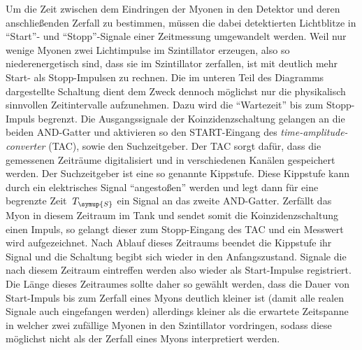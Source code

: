 Um die Zeit zwischen dem Eindringen der Myonen in den Detektor und deren
anschließenden Zerfall zu bestimmen, müssen die dabei detektierten Lichtblitze
in \enquote{Start}- und \enquote{Stopp}-Signale einer Zeitmessung umgewandelt
werden. Weil nur wenige Myonen zwei Lichtimpulse im Szintillator erzeugen, also
so niederenergetisch sind, dass sie im Szintillator zerfallen, ist mit deutlich
mehr Start- als Stopp-Impulsen zu rechnen. Die im unteren Teil des Diagramms
dargestellte Schaltung dient dem Zweck dennoch möglichst nur die physikalisch
sinnvollen Zeitintervalle aufzunehmen. Dazu wird die \enquote{Wartezeit} bis zum
Stopp-Impuls begrenzt. Die Ausgangssignale der Koinzidenzschaltung gelangen an
die beiden AND-Gatter und aktivieren so den START-Eingang des
\textit{time-amplitude-converter} (TAC), sowie den Suchzeitgeber. Der TAC sorgt
dafür, dass die gemessenen Zeiträume digitalisiert und in verschiedenen Kanälen
gespeichert werden. Der Suchzeitgeber ist eine so genannte Kippstufe. Diese
Kippstufe kann durch ein elektrisches Signal \enquote{angestoßen} werden und
legt dann für eine begrenzte Zeit~$T_{\symup{S}}$ ein Signal an das zweite
AND-Gatter. Zerfällt das Myon in diesem Zeitraum im Tank und sendet somit die
Koinzidenzschaltung einen Impuls, so gelangt dieser zum Stopp-Eingang des TAC
und ein Messwert wird aufgezeichnet. Nach Ablauf dieses Zeitraums beendet die
Kippstufe ihr Signal und die Schaltung begibt sich wieder in den Anfangszustand.
Signale die nach diesem Zeitraum eintreffen werden also wieder als Start-Impulse
registriert. Die Länge dieses Zeitraumes sollte daher so gewählt werden, dass
die Dauer von Start-Impuls bis zum Zerfall eines Myons deutlich kleiner ist
(damit alle realen Signale auch eingefangen werden) allerdings kleiner als die
erwartete Zeitspanne in welcher zwei zufällige Myonen in den Szintillator
vordringen, sodass diese möglichst nicht als der Zerfall eines Myons
interpretiert werden.

